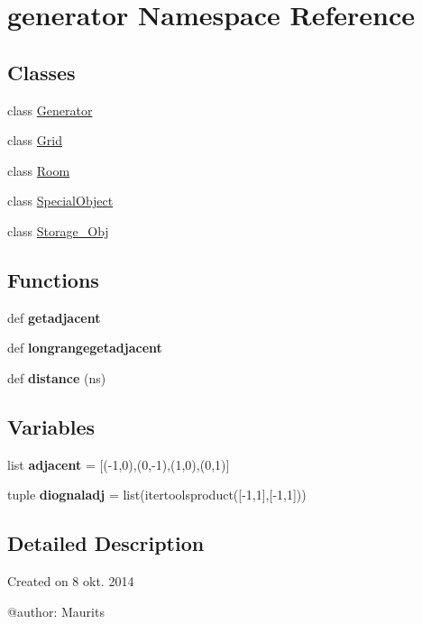 \hypertarget{namespacegenerator}{}\section{generator Namespace Reference}
\label{namespacegenerator}
\subsection*{Classes}
\begin{DoxyCompactItemize}
\item 
class \hyperlink{classgenerator_1_1_generator}{Generator}
\item 
class \hyperlink{classgenerator_1_1_grid}{Grid}
\item 
class \hyperlink{classgenerator_1_1_room}{Room}
\item 
class \hyperlink{classgenerator_1_1_special_object}{Special\+Object}
\item 
class \hyperlink{classgenerator_1_1_storage___obj}{Storage\+\_\+\+Obj}
\end{DoxyCompactItemize}
\subsection*{Functions}
\begin{DoxyCompactItemize}
\item 
\hypertarget{namespacegenerator_aef590620417d1e57a9ee2d1261b225dd}{}def {\bfseries getadjacent}\label{namespacegenerator_aef590620417d1e57a9ee2d1261b225dd}

\item 
\hypertarget{namespacegenerator_a41bc727f278e1c393b5dc65a6d0cbb6d}{}def {\bfseries longrangegetadjacent}\label{namespacegenerator_a41bc727f278e1c393b5dc65a6d0cbb6d}

\item 
\hypertarget{namespacegenerator_a7dc6d1db9337abd6ae0a6cd38ab0e543}{}def {\bfseries distance} (ns)\label{namespacegenerator_a7dc6d1db9337abd6ae0a6cd38ab0e543}

\end{DoxyCompactItemize}
\subsection*{Variables}
\begin{DoxyCompactItemize}
\item 
\hypertarget{namespacegenerator_a6b6bf13d1fae3f16fceb37ea15bbf3b2}{}list {\bfseries adjacent} = \mbox{[}(-\/1,0),(0,-\/1),(1,0),(0,1)\mbox{]}\label{namespacegenerator_a6b6bf13d1fae3f16fceb37ea15bbf3b2}

\item 
\hypertarget{namespacegenerator_a9d8c602c70326bfe4094160b6b60f940}{}tuple {\bfseries diognaladj} = list(itertoolsproduct(\mbox{[}-\/1,1\mbox{]},\mbox{[}-\/1,1\mbox{]}))\label{namespacegenerator_a9d8c602c70326bfe4094160b6b60f940}

\end{DoxyCompactItemize}


\subsection{Detailed Description}
\begin{DoxyVerb}Created on 8 okt. 2014

@author: Maurits
\end{DoxyVerb}
 